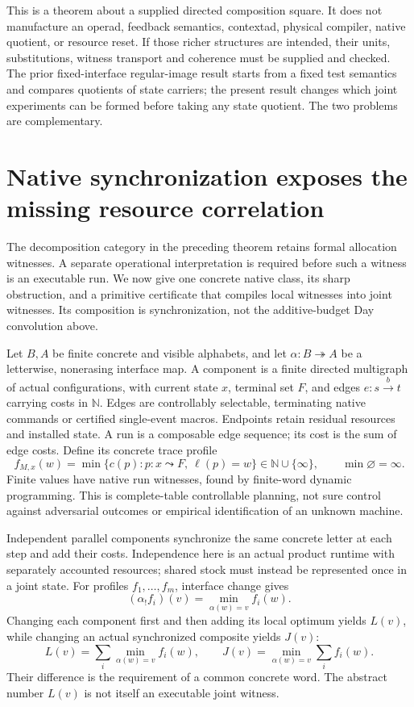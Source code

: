 \documentclass[11pt]{article}
\theoremstyle{definition}\newtheorem{definition}[theorem]{Definition}
\theoremstyle{remark}\newtheorem{remark}[theorem]{Remark}
\newcommand{\N}{\mathbb N}
\newcommand{\Cost}{\mathbb N\cup\{\infty\}}
\begin{document}
This is a theorem about a supplied directed composition square. It does
not manufacture an operad, feedback semantics, contextad, physical
compiler, native quotient, or resource reset. If those richer structures
are intended, their units, substitutions, witness transport and coherence
must be supplied and checked. The prior fixed-interface regular-image
result starts from a fixed test semantics and compares quotients of state
carriers; the present result changes which joint experiments can be formed
before taking any state quotient. The two problems are complementary.



\section{Native synchronization exposes the missing resource correlation}
\label{sec:native}
The decomposition category in the preceding theorem retains formal
allocation witnesses. A separate operational interpretation is required
before such a witness is an executable run. We now give one concrete
native class, its sharp obstruction, and a primitive certificate that
compiles local witnesses into joint witnesses. Its composition is
synchronization, not the additive-budget Day convolution above.

Let $B,A$ be finite concrete and visible alphabets, and let
$\alpha:B\twoheadrightarrow A$ be a letterwise, nonerasing interface
map. A component is a finite directed multigraph of actual configurations,
with current state $x$, terminal set $F$, and edges
$e:s\xrightarrow{b}t$ carrying costs in $\N$. Edges are controllably
selectable, terminating native commands or certified single-event macros.
Endpoints retain residual resources and installed state. A run is a
composable edge sequence; its cost is the sum of edge costs.
Define its concrete trace profile
\[
 f_{M,x}(w)=\min\{c(p):p:x\leadsto F,\ \ell(p)=w\}\in\Cost,
 \qquad \min\varnothing=\infty.
\]
Finite values have native run witnesses, found by finite-word dynamic
programming. This is complete-table controllable planning, not sure
control against adversarial outcomes or empirical identification of an
unknown machine.

Independent parallel components synchronize the same concrete letter at
each step and add their costs. Independence here is an actual product
runtime with separately accounted resources; shared stock must instead
be represented once in a joint state. For profiles $f_1,\ldots,f_m$,
interface change gives
\[
 (\alpha_!f_i)(v)=\min_{\alpha(w)=v}f_i(w).
\]
Changing each component first and then adding its local optimum yields
$L(v)$, while changing an actual synchronized composite yields $J(v)$:
\[
 L(v)=\sum_i\min_{\alpha(w)=v}f_i(w),\qquad
 J(v)=\min_{\alpha(w)=v}\sum_i f_i(w).
\]
Their difference is the requirement of a common concrete word.
The abstract number $L(v)$ is not itself an executable joint witness.
\end{document}
